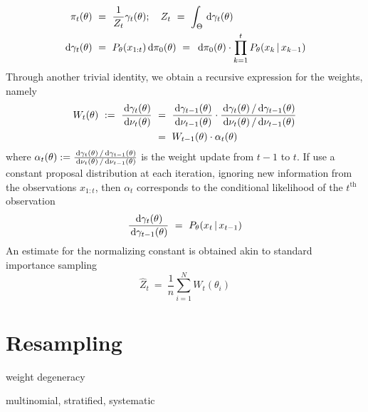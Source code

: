 \begin{align*}
\pi_t(\theta) ~ &= ~ \frac{1}{Z_t} \gamma_t(\theta); \quad Z_t ~ = ~ \int_\Theta \, \textrm{d} \gamma_t(\theta) \\
\, \textrm{d} \gamma_t(\theta) ~ &= ~ P_\theta(x_{1:t}) \, \textrm{d} \pi_0(\theta) ~ = ~ \, \textrm{d} \pi_0(\theta) \cdot \prod_{k=1}^t P_\theta(x_k \,|\, x_{k-1}) \\
\end{align*}
Through another trivial identity, we obtain a recursive expression for the weights, namely
\begin{align*}
W_t(\theta) ~ := ~ \frac{\, \textrm{d} \gamma_t(\theta)}{\, \textrm{d} \nu_t(\theta)} ~ &= ~ \frac{\, \textrm{d} \gamma_{t-1}(\theta)}{\, \textrm{d} \nu_{t-1}(\theta)} \cdot \frac{\, \textrm{d} \gamma_t(\theta) \, / \, \textrm{d} \gamma_{t-1}(\theta)}{\, \textrm{d} \nu_t(\theta) \, / \, \textrm{d} \nu_{t-1}(\theta)} \\
	&= ~ W_{t-1}(\theta) \cdot \alpha_t(\theta)
\end{align*}
where $\alpha_t(\theta) := \frac{\, \textrm{d} \gamma_t(\theta) \, / \, \textrm{d} \gamma_{t-1}(\theta)}{\, \textrm{d} \nu_t(\theta) \, / \, \textrm{d} \nu_{t-1}(\theta)}$ is the weight update from $t-1$ to $t$. If use a constant proposal distribution at each iteration, ignoring new information from the observations $x_{1:t}$, then $\alpha_t$ corresponds to the conditional likelihood of the $t^{\textrm{th}}$ observation
\begin{equation*}
\frac{\, \textrm{d} \gamma_t(\theta)}{\, \textrm{d} \gamma_{t-1}(\theta)} ~ = ~ P_\theta(x_t \,|\, x_{t-1})
\end{equation*}
An estimate for the normalizing constant is obtained akin to standard importance sampling
\begin{equation*}
\widehat{Z}_t ~ = ~ \frac{1}{n} \sum_{i=1}^N W_t(\theta_i)
\end{equation*}

\section{Resampling}

weight degeneracy

multinomial, stratified, systematic

